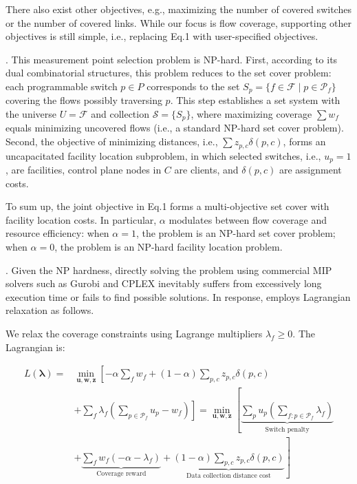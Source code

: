 There also exist other objectives, e.g., maximizing the number of covered switches or the number of covered links. While our focus is flow coverage, supporting other objectives is still simple, i.e., replacing Eq.1 with user-specified objectives. 

. This measurement point selection problem is NP-hard. First, according to its dual combinatorial structures, this problem reduces to the set cover problem: each programmable switch $p \in P$ corresponds to the set $S_p = \{ f \in \mathcal{F} \mid p \in \mathcal{P}_f \}$ covering the flows possibly traversing $p$. This step establishes a set system with the universe $U = \mathcal{F}$ and collection $\mathcal{S} = \{ S_p \}$, where maximizing coverage $\sum w_f$ equals minimizing uncovered flows (i.e., a standard NP-hard set cover problem). Second, the objective of minimizing distances, i.e., $\sum z_{p,c} \delta(p,c)$, forms an uncapacitated facility location subproblem, in which selected switches, i.e., $u_p=1$, are facilities, control plane nodes in $C$ are clients, and $\delta(p,c)$ are assignment costs. 

To sum up, the joint objective in Eq.1 forms a multi-objective set cover with facility location costs. In particular, $\alpha$ modulates between flow coverage and resource efficiency: when $\alpha=1$, the problem is an NP-hard set cover problem; when $\alpha=0$, the problem is an NP-hard facility location problem.  

. Given the NP hardness, directly solving the problem using commercial MIP solvers such as Gurobi \cite{gurobi} and CPLEX \cite{cplex} inevitably suffers from excessively long execution time or fails to find possible solutions. In response, \sysname employs Lagrangian relaxation as follows.

We relax the coverage constraints using Lagrange multipliers \(\lambda_f \geq 0\). The Lagrangian is:

\vspace{-10pt}
{\footnotesize
\begin{align}
L(\boldsymbol{\lambda}) = &\min_{\mathbf{u},\mathbf{w},\mathbf{z}} \left[ 
-\alpha \sum_{f} w_f + (1-\alpha) \sum_{p,c} z_{p,c} \delta(p,c) \right. \nonumber \\ &\left. + \sum_{f} \lambda_f \left( \sum_{p \in \mathcal{P}_f} u_p - w_f \right)
\right] 
= \min_{\mathbf{u},\mathbf{w},\mathbf{z}} \left[ 
\underbrace{\sum_{p} u_p \left( \sum_{f: p \in \mathcal{P}_f} \lambda_f \right)}_{\text{Switch penalty}} \right. \nonumber \\ &+ \left.
\underbrace{\sum_{f} w_f (-\alpha - \lambda_f)}_{\text{Coverage reward}} +
\underbrace{(1-\alpha) \sum_{p,c} z_{p,c} \delta(p,c)}_{\text{Data collection distance cost}}
\right]
\end{align}}
\vspace{-7pt}

